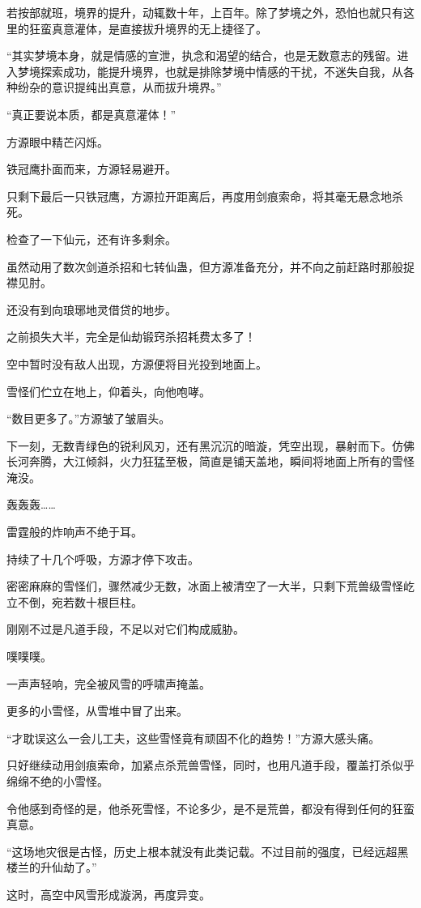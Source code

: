 \begin{this_body}
若按部就班，境界的提升，动辄数十年，上百年。除了梦境之外，恐怕也就只有这里的狂蛮真意灌体，是直接拔升境界的无上捷径了。

“其实梦境本身，就是情感的宣泄，执念和渴望的结合，也是无数意志的残留。进入梦境探索成功，能提升境界，也就是排除梦境中情感的干扰，不迷失自我，从各种纷杂的意识提纯出真意，从而拔升境界。”

“真正要说本质，都是真意灌体！”

方源眼中精芒闪烁。

铁冠鹰扑面而来，方源轻易避开。

只剩下最后一只铁冠鹰，方源拉开距离后，再度用剑痕索命，将其毫无悬念地杀死。

检查了一下仙元，还有许多剩余。

虽然动用了数次剑道杀招和七转仙蛊，但方源准备充分，并不向之前赶路时那般捉襟见肘。

还没有到向琅琊地灵借贷的地步。

之前损失大半，完全是仙劫锻窍杀招耗费太多了！

空中暂时没有敌人出现，方源便将目光投到地面上。

雪怪们伫立在地上，仰着头，向他咆哮。

“数目更多了。”方源皱了皱眉头。

下一刻，无数青绿色的锐利风刃，还有黑沉沉的暗漩，凭空出现，暴射而下。仿佛长河奔腾，大江倾斜，火力狂猛至极，简直是铺天盖地，瞬间将地面上所有的雪怪淹没。

轰轰轰……

雷霆般的炸响声不绝于耳。

持续了十几个呼吸，方源才停下攻击。

密密麻麻的雪怪们，骤然减少无数，冰面上被清空了一大半，只剩下荒兽级雪怪屹立不倒，宛若数十根巨柱。

刚刚不过是凡道手段，不足以对它们构成威胁。

噗噗噗。

一声声轻响，完全被风雪的呼啸声掩盖。

更多的小雪怪，从雪堆中冒了出来。

“才耽误这么一会儿工夫，这些雪怪竟有顽固不化的趋势！”方源大感头痛。

只好继续动用剑痕索命，加紧点杀荒兽雪怪，同时，也用凡道手段，覆盖打杀似乎绵绵不绝的小雪怪。

令他感到奇怪的是，他杀死雪怪，不论多少，是不是荒兽，都没有得到任何的狂蛮真意。

“这场地灾很是古怪，历史上根本就没有此类记载。不过目前的强度，已经远超黑楼兰的升仙劫了。”

这时，高空中风雪形成漩涡，再度异变。


\end{this_body}
